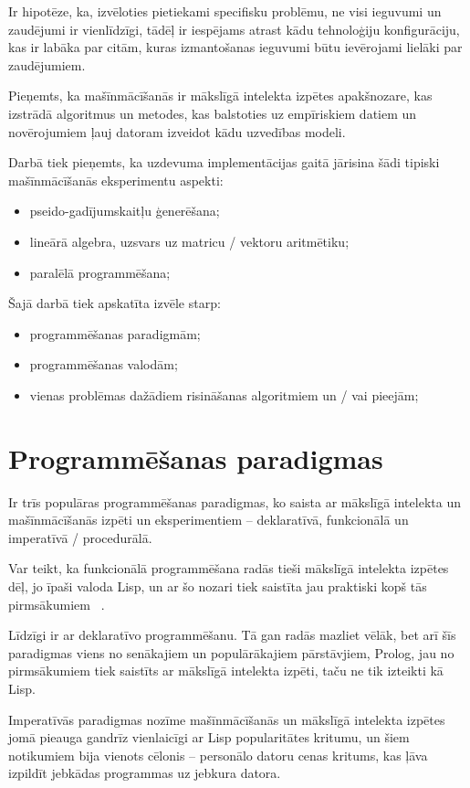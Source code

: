 \documentclass{ludis}
\begin{document}
Ir hipotēze, ka, izvēloties pietiekami specifisku problēmu, ne visi ieguvumi un zaudējumi ir vienlīdzīgi, tādēļ ir iespējams atrast kādu tehnoloģiju konfigurāciju, kas ir labāka par citām, kuras izmantošanas ieguvumi būtu ievērojami lielāki par zaudējumiem.

Pieņemts, ka mašīnmācīšanās ir mākslīgā intelekta izpētes apakšnozare, kas izstrādā algoritmus un metodes, kas balstoties uz empīriskiem datiem un novērojumiem ļauj datoram izveidot kādu uzvedības modeli.

Darbā tiek pieņemts, ka uzdevuma implementācijas gaitā jārisina šādi tipiski mašīnmācīšanās eksperimentu aspekti:
\begin{itemize}
\item pseido-gadījumskaitļu ģenerēšana;
\item lineārā algebra, uzsvars uz matricu / vektoru aritmētiku;
\item paralēlā programmēšana;
\end{itemize}

Šajā darbā tiek apskatīta izvēle starp:
\begin{itemize}
\item programmēšanas paradigmām;
\item programmēšanas valodām;
\item vienas problēmas dažādiem risināšanas algoritmiem un / vai pieejām;
\end{itemize}

\section{Programmēšanas paradigmas} \label{sec:paradigms}
Ir trīs populāras programmēšanas paradigmas, ko saista ar mākslīgā intelekta un mašīnmācīšanās izpēti un eksperimentiem -- deklaratīvā, funkcionālā un imperatīvā / procedurālā. 

Var teikt, ka funkcionālā programmēšana radās tieši mākslīgā intelekta izpētes dēļ, jo īpaši valoda Lisp, un ar šo nozari tiek saistīta jau praktiski kopš tās pirmsākumiem ~\cite{hist_lisp}. 

Līdzīgi ir ar deklaratīvo programmēšanu. Tā gan radās mazliet vēlāk, bet arī šīs paradigmas viens no senākajiem un populārākajiem pārstāvjiem, Prolog, jau no pirmsākumiem tiek saistīts ar mākslīgā intelekta izpēti, taču ne tik izteikti kā Lisp.

Imperatīvās paradigmas nozīme mašīnmācīšanās un mākslīgā intelekta izpētes jomā pieauga gandrīz vienlaicīgi ar Lisp popularitātes kritumu, un šiem notikumiem bija vienots cēlonis -- personālo datoru cenas kritums, kas ļāva izpildīt jebkādas programmas uz jebkura datora. 
\end{document}
